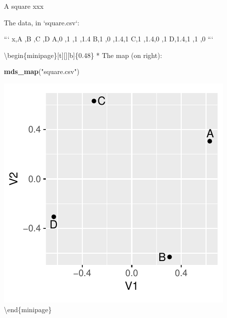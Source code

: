 \documentclass[ignorenonframetext,]{beamer}
\newenvironment{Shaded}{\begin{snugshade}}{\end{snugshade}}
\newcommand{\KeywordTok}[1]{\textcolor[rgb]{0.13,0.29,0.53}{\textbf{#1}}}
\newcommand{\NormalTok}[1]{#1}
\newcommand{\StringTok}[1]{\textcolor[rgb]{0.31,0.60,0.02}{#1}}
\begin{document}
\begin{frame}[fragile]{A square xxx}
\protect\hypertarget{a-square-xxx}{}

\begin{minipage}[t]{0.5\textwidth}

The data, in `square.csv`:
\begin{small}

```
x,A  ,B  ,C  ,D
A,0  ,1  ,1  ,1.4
B,1  ,0  ,1.4,1
C,1  ,1.4,0  ,1
D,1.4,1  ,1  ,0
```
\end{small}
\end{minipage}\hfill

\textbackslash{}begin\{minipage\}{[}t{]}{[}{]}{[}b{]}\{0.48\textwidth\}
* The map (on right):

\begin{Shaded}
\begin{Highlighting}[]
\KeywordTok{mds_map}\NormalTok{(}\StringTok{"square.csv"}\NormalTok{)}
\end{Highlighting}
\end{Shaded}

\includegraphics{figure/unnamed-chunk-13-1.pdf}
\textbackslash{}end\{minipage\}

\end{frame}
\end{document}

